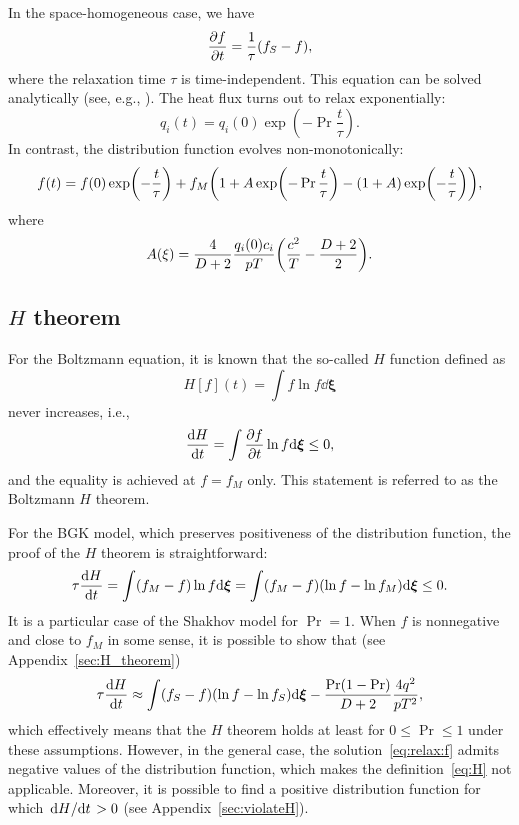 \documentclass{article}
\newcommand{\bxi}{\boldsymbol{\xi}}
\begin{document}
In the space-homogeneous case, we have
\begin{equation}\label{eq:relax}
    \pdv{f}{t} = \frac1\tau\qty(f_S - f),
\end{equation}
where the relaxation time $\tau$ is time-independent.
This equation can be solved analytically (see, e.g., \cite{titarev2004numerical}).
The heat flux turns out to relax exponentially:
\begin{equation}\label{eq:relax:q}
    q_i(t) = q_i(0)\exp(-\Pr\frac{t}\tau).
\end{equation}
In contrast, the distribution function evolves non-monotonically:
\begin{equation}\label{eq:relax:f}
    f(t) = f(0)\exp(-\frac{t}\tau) + f_M\qty(1 + A\exp(-\Pr\frac{t}\tau) - (1+A)\exp(-\frac{t}\tau)),
\end{equation}
where
\begin{equation}\label{eq:relax:A}
    A(\xi) = \frac{4}{D+2}\frac{q_i(0)c_i}{pT}\qty(\frac{c^2}{T} - \frac{D+2}2).
\end{equation}

\subsection{$H$ theorem}

For the Boltzmann equation, it is known that the so-called $H$ function defined as
\begin{equation}\label{eq:H}
    H[f](t) = \int f\ln{f}\dd\bxi
\end{equation}
never increases, i.e.,
\begin{equation}\label{eq:dHdt}
    \dv{H}{t} = \int \pdv{f}{t}\ln{f}\dd\bxi \leq 0,
\end{equation}
and the equality is achieved at $f = f_M$ only.
This statement is referred to as the Boltzmann $H$ theorem.

For the BGK model, which preserves positiveness of the distribution function, the proof of the $H$ theorem is straightforward:
\begin{equation}\label{eq:dHdt_BGK}
    \tau\dv{H}{t} = \int(f_M-f)\ln{f}\dd\bxi = \int (f_M-f)(\ln{f}-\ln{f_M})\dd\bxi \leq 0.
\end{equation}
It is a particular case of the Shakhov model for $\Pr=1$. When $f$ is nonnegative and close to $f_M$ in some sense,
it is possible to show that (see Appendix~\ref{sec:H_theorem})
\begin{equation}\label{eq:dHdt_Shakhov}
    \tau\dv{H}{t} \approx \int(f_S-f)(\ln{f}-\ln{f_S})\dd\bxi - \frac{\Pr(1-\Pr)}{D+2}\frac{4q^2}{pT^2},
\end{equation}
which effectively means that the $H$ theorem holds at least for $0\leq\Pr\leq1$ under these assumptions.
However, in the general case, the solution~\eqref{eq:relax:f} admits negative values of the distribution function,
which makes the definition~\eqref{eq:H} not applicable.
Moreover, it is possible to find a positive distribution function for which $\dv*{H}{t}>0$ (see Appendix~\ref{sec:violateH}).
\end{document}
